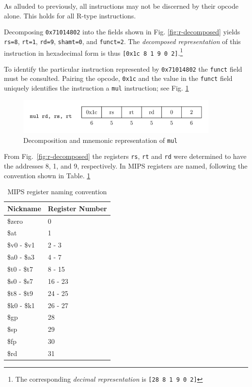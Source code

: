 \documentclass[a4paper]{article}
\begin{document}
As alluded to previously, all instructions may not be discerned by
their opcode alone. This holds for all R-type instructions.

Decomposing \texttt{0x71014802} into the fields shown in
Fig. \ref{fig:r-decomposed} yields \texttt{rs=8}, \texttt{rt=1},
\texttt{rd=9}, \texttt{shamt=0}, and \texttt{funct=2}. The
\emph{decomposed representation} of this instruction in hexadecimal
form is thus \texttt{[0x1c 8 1 9 0 2]}.\footnote{The corresponding
\emph{decimal representation} is \texttt{[28 8 1 9 0 2]}}

To identify the particular instruction represented by
\texttt{0x71014802} the \texttt{funct} field must be
consulted. Pairing the opcode, \texttt{0x1c} and the value in the
\texttt{funct} field uniquely identifies the instruction a
\texttt{mul} instruction; see Fig. \ref{fig:mul-decomposed}

\begin{figure}[H]
  \centering
  \includegraphics[width=0.9\textwidth]{figures/mul-decomposed.png}
  \caption{Decomposition and mnemonic representation of \texttt{mul}}
  \label{fig:mul-decomposed}
\end{figure}

From Fig.~\ref{fig:r-decomposed} the registers \texttt{rs},
\texttt{rt} and \texttt{rd} were determined to have the addresses 8,
1, and 9, respectively. In MIPS registers are named, following the
convention shown in Table. \ref{table:mips-register-naming-convention}

\begin{table}[H]
\centering
\caption{MIPS register naming convention}
\begin{tabular}{ll}
\toprule
Nickname & Register Number \\
\midrule
\$zero      & 0            \\
\$at        & 1            \\
\$v0 - \$v1 & 2 - 3        \\
\$a0 - \$a3 & 4 - 7        \\
\$t0 - \$t7 & 8 - 15       \\
\$s0 - \$s7 & 16 - 23      \\
\$t8 - \$t9 & 24 - 25      \\
\$k0 - \$k1 & 26 - 27      \\
\$gp        & 28           \\
\$sp        & 29           \\
\$fp        & 30           \\
\$rd        & 31           \\
\bottomrule
\end{tabular}
\label{table:mips-register-naming-convention}
\end{table}
\end{document}
